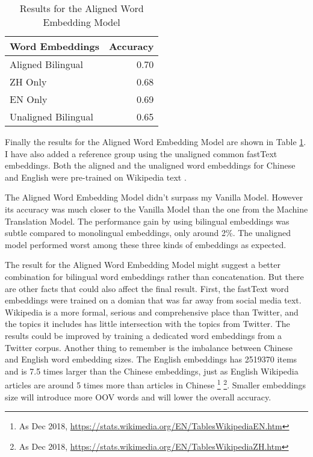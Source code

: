 \documentclass[11pt,a4paper]{article}
\begin{document}
\begin{table}[t]
  \begin{center}
  \begin{tabular}{|l|r|}
  \hline \bf Word Embeddings & \bf Accuracy \\ \hline
  Aligned Bilingual & 0.70 \\
  \hspace{0.5cm} ZH Only & 0.68 \\
  \hspace{0.5cm} EN Only & 0.69 \\
  Unaligned Bilingual & 0.65 \\
  \hline
  \end{tabular}
  \end{center}
  \caption{\label{tab:cnn-results-table} Results for the Aligned Word Embedding Model}
\end{table}

Finally the results for the Aligned Word Embedding Model are shown in Table \ref{tab:cnn-results-table}. I have also added a reference group using the unaligned common fastText embeddings. Both the aligned and the unaligned word embeddings for Chinese and English were pre-trained on Wikipedia text \cite{bojanowski2017enriching}.

The Aligned Word Embedding Model didn't surpass my Vanilla Model. However its accuracy was much closer to the Vanilla Model than the one from the Machine Translation Model. The performance gain by using bilingual embeddings was subtle compared to monolingual embeddings, only around 2\%. The unaligned model performed worst among these three kinds of embeddings as expected.

The result for the Aligned Word Embedding Model might suggest a better combination for bilingual word embeddings rather than concatenation. But there are other facts that could also affect the final result. First, the fastText word embeddings were trained on a domian that was far away from social media text. Wikipedia is a more formal, serious and comprehensive place than Twitter, and the topics it includes has little intersection with the topics from Twitter. The results could be improved by training a dedicated word embeddings from a Twitter corpus. Another thing to remember is the imbalance between Chinese and English word embedding sizes. The English embeddings has 2519370 items and is 7.5 times larger than the Chinese embeddings, just as English Wikipedia articles are around 5 times more than articles in Chinese \footnote{As Dec 2018, \url{https://stats.wikimedia.org/EN/TablesWikipediaEN.htm}} \footnote{As Dec 2018, \url{https://stats.wikimedia.org/EN/TablesWikipediaZH.htm}}. Smaller embeddings size will introduce more OOV words and will lower the overall accuracy.
\end{document}
